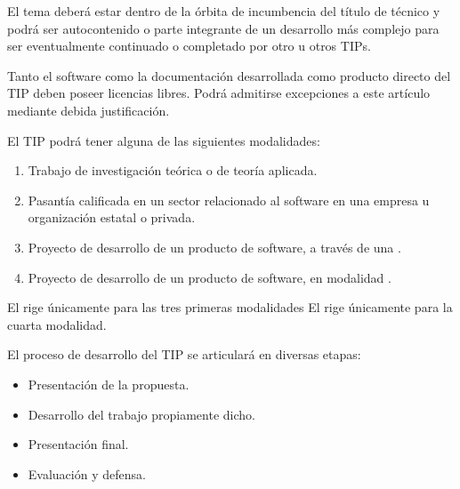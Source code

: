 \articulo El tema deberá estar dentro de la órbita de incumbencia del título de técnico y
podrá ser autocontenido o parte integrante de un desarrollo más complejo para ser
eventualmente continuado o completado por otro u otros TIPs.

\articulo Tanto el software como la documentación desarrollada como producto
directo del TIP deben poseer licencias libres. Podrá admitirse excepciones a
este artículo mediante debida justificación.

\articulo El TIP podrá tener alguna de las siguientes modalidades:
\begin{enumerate}
\item Trabajo de investigación teórica o de teoría aplicada.
\item Pasantía calificada en un sector relacionado al software en una
empresa u organización estatal o privada.
\item Proyecto de desarrollo de un producto de software, a través de una
\modoTutorado.
\item Proyecto de desarrollo de un producto de software, en modalidad \modoCursada.
\end{enumerate}

El \capTradicional{} rige únicamente para las tres primeras modalidades
El \capCursada{} rige únicamente para la cuarta modalidad.



\articulo El proceso de desarrollo del TIP se articulará en diversas etapas:
\begin{itemize}
 \item Presentación de la propuesta.
 \item Desarrollo del trabajo propiamente dicho.
 \item Presentación final.
 \item Evaluación y defensa.
\end{itemize}


